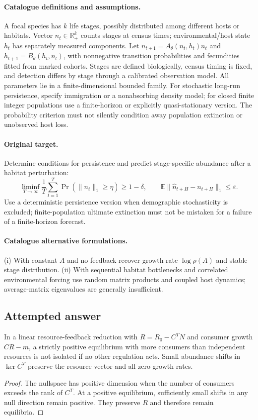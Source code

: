 \documentclass[11pt]{article}
\begin{document}
\paragraph{Catalogue definitions and assumptions.}
A focal species has $k$ life stages, possibly distributed among different hosts or habitats. Vector $n_t\in\mathbb{R}_+^k$ counts stages at census times; environmental/host state $h_t$ has separately measured components. Let $n_{t+1}=A_\theta(n_t,h_t)n_t$ and $h_{t+1}=B_\theta(h_t,n_t)$, with nonnegative transition probabilities and fecundities fitted from marked cohorts. Stages are defined biologically, census timing is fixed, and detection differs by stage through a calibrated observation model. All parameters lie in a finite-dimensional bounded family. For stochastic long-run persistence, specify immigration or a nonabsorbing density model; for closed finite integer populations use a finite-horizon or explicitly quasi-stationary version. The probability criterion must not silently condition away population extinction or unobserved host loss.
\paragraph{Original target.}
Determine conditions for persistence and predict stage-specific abundance after a habitat perturbation:
\[
 \liminf_{T\to\infty}\frac1T\sum_{t=1}^T
 \Pr(\|n_t\|_1\ge\eta)\ge1-\delta,
 \qquad
 \mathbb{E}\|\widehat n_{t+H}-n_{t+H}\|_1\le\varepsilon.
\]
Use a deterministic persistence version when demographic stochasticity is excluded; finite-population ultimate extinction must not be mistaken for a failure of a finite-horizon forecast.
\paragraph{Catalogue alternative formulations.}
(i) With constant $A$ and no feedback recover growth rate $\log\rho(A)$ and stable stage distribution. (ii) With sequential habitat bottlenecks and correlated environmental forcing use random matrix products and coupled host dynamics; average-matrix eigenvalues are generally insufficient.
\subsection{Attempted answer}
\begin{proposition}
In a linear resource-feedback reduction with $R=R_0-C^TN$ and consumer growth $CR-m$, a strictly positive equilibrium with more consumers than independent resources is not isolated if no other regulation acts. Small abundance shifts in $\ker C^T$ preserve the resource vector and all zero growth rates.
\end{proposition}
\begin{proof}
The nullspace has positive dimension when the number of consumers exceeds the rank of $C^T$. At a positive equilibrium, sufficiently small shifts in any null direction remain positive. They preserve $R$ and therefore remain equilibria.
\end{proof}
\end{document}
